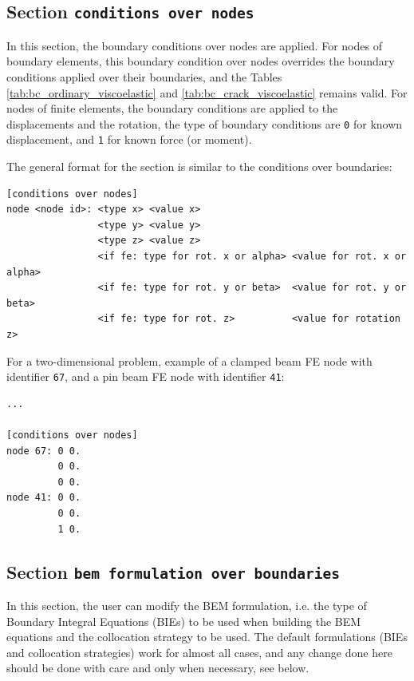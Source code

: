 \documentclass[a4paper,fleqn]{book}
\begin{document}
\subsection{Section \texttt{conditions over nodes}}
In this section, the boundary conditions over nodes are applied. For nodes of boundary elements, this boundary condition over nodes overrides the boundary conditions applied over their boundaries, and the Tables \ref{tab:bc_ordinary_viscoelastic} and \ref{tab:bc_crack_viscoelastic} remains valid. For nodes of finite elements, the boundary conditions are applied to the displacements and the rotation, the type of boundary conditions are \texttt{0} for known displacement, and \texttt{1} for known force (or moment).

The general format for the section is similar to the conditions over boundaries:
\begin{Verbatim}[frame=single, fontsize=\small, label={general format of section [conditions over nodes]}]
[conditions over nodes]
node <node id>: <type x> <value x>
                <type y> <value y>
                <type z> <value z>
                <if fe: type for rot. x or alpha> <value for rot. x or alpha>
                <if fe: type for rot. y or beta>  <value for rot. y or beta>
                <if fe: type for rot. z>          <value for rotation z>
\end{Verbatim} 

For a two-dimensional problem, example of a clamped beam FE node with identifier \texttt{67}, and a pin beam FE node with identifier \texttt{41}: 
\begin{Verbatim}[frame=single, fontsize=\small, label={input.dat}]
...

[conditions over nodes]
node 67: 0 0.
         0 0.
         0 0.
node 41: 0 0.
         0 0.
         1 0.
\end{Verbatim} 

\subsection{Section \texttt{bem formulation over boundaries}}

In this section, the user can modify the BEM formulation, i.e. the type of Boundary Integral Equations (BIEs) to be used when building the BEM equations and the collocation strategy to be used. The default formulations (BIEs and collocation strategies) work for almost all cases, and any change done here should be done with care and only when necessary, see below. 
\end{document}

